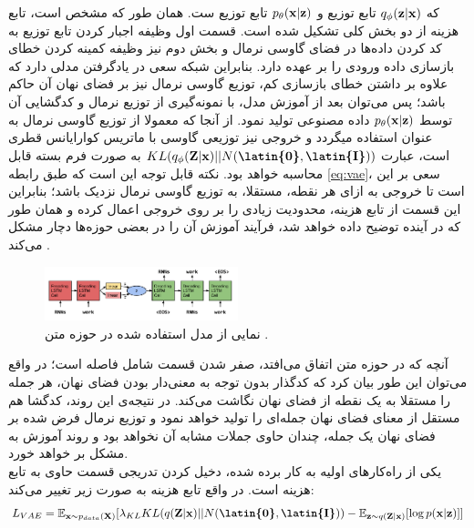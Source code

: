 که $q_\phi({\bf z}|{\bf x})$ تابع توزیع \encoder{} و $p_\theta({\bf x}|{\bf z})$ تابع توزیع \decoder ست. همان طور که مشخص است، تابع هزینه از دو بخش کلی تشکیل شده است. قسمت اول وظیفه اجبار کردن تابع توزیع \encoder{} به کد کردن داده‌ها در فضای گاوسی نرمال و بخش دوم نیز وظیفه کمینه کردن خطای بازسازی داده ورودی را بر عهده دارد. بنابراین شبکه سعی در یادگرفتن مدلی دارد که علاوه بر داشتن خطای بازسازی کم، توزیع گاوسی نرمال نیز بر فضای نهان آن حاکم باشد؛ پس می‌توان بعد از آموزش مدل، با نمونه‌گیری از توزیع نرمال و کدگشایی آن توسط $p_\theta({\bf x}|{\bf z})$ داده مصنوعی تولید نمود. از آنجا که معمولا از توزیع گاوسی نرمال به عنوان \priordist{} استفاده میگردد و خروجی \encoder{} نیز توزیعی گاوسی با ماتریس کوارایانس قطری است، عبارت $KL(q_\phi(\bff{Z}|\bff{x}) || N(\textbf{\latin{0}},\textbf{\latin{I}}))$ به صورت فرم بسته قابل محاسبه خواهد بود. نکته قابل توجه این است که طبق رابطه \ref{eq:vae}، سعی بر این است تا خروجی \encoder{} به ازای هر نقطه، مستقلا، به توزیع گاوسی نرمال نزدیک باشد؛ بنابراین این قسمت از تابع هزینه، محدودیت زیادی را بر روی خروجی \encoder{} اعمال کرده و همان طور که در آینده توضیح داده خواهد شد، فرآیند آموزش آن را در بعضی حوزه‌ها دچار مشکل می‌کند \cite{vae_text}. 
\\
\begin{figure}[H]
	\centering
	\includegraphics[width=0.5\textwidth]{images/vae-text.png}
	\caption{
		نمایی از مدل \vae{} استفاده شده در حوزه متن
		\cite{vae_text}.}
	\label{fig:vae-text}
\end{figure}
\label{chap2:latent_ignore}
آنچه که در حوزه متن اتفاق می‌افتد، صفر شدن قسمت شامل فاصله   است؛ در واقع می‌توان این طور بیان کرد که کدگذار بدون توجه به معنی‌دار بودن فضای نهان، هر جمله را مستقلا به یک نقطه از فضای نهان نگاشت می‌کند. در نتیجه‌ی این روند، کدگشا هم مستقل از معنای فضای نهان جمله‌ای را تولید خواهد نمود و توزیع نرمال فرض شده بر فضای نهان یک جمله، چندان حاوی جملات مشابه آن نخواهد بود و روند آموزش به مشکل بر خواهد خورد. \\
یکی از راه‌کارهای اولیه به کار برده شده، دخیل کردن تدریجی قسمت حاوی  به تابع هزینه است. در واقع تابع هزینه به صورت زیر تغییر می‌کند:
\begin{equation}
	\begin{split}
		L_{VAE} = \expected_{\bff{x} \sim p_{data}(\bff{X})} [\lambda_{KL} KL(q(\bff{Z}|\bff{x}) || N(\textbf{\latin{0}},\textbf{\latin{I}}))- \expected_{\bff{z} \sim q(\bff{Z}|\bff{x})}[\log p(\bff{x}|\bff{z})]]
	\end{split}
\end{equation}
